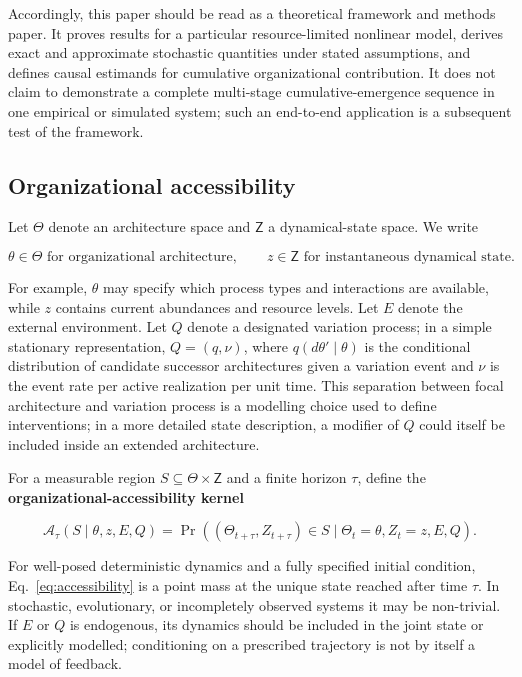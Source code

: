 \documentclass[11pt,a4paper]{article}
\begin{document}
Accordingly, this paper should be read as a theoretical framework and methods paper. It proves results for a particular resource-limited nonlinear model, derives exact and approximate stochastic quantities under stated assumptions, and defines causal estimands for cumulative organizational contribution. It does not claim to demonstrate a complete multi-stage cumulative-emergence sequence in one empirical or simulated system; such an end-to-end application is a subsequent test of the framework.

\subsection{Organizational accessibility}

Let $\mathsf\Theta$ denote an architecture space and $\mathsf Z$ a dynamical-state space. We write

\[
\theta\in\mathsf\Theta \text{ for organizational architecture},
\qquad
z\in\mathsf Z \text{ for instantaneous dynamical state}.
\]

For example, $\theta$ may specify which process types and interactions are available, while $z$ contains current abundances and resource levels. Let $E$ denote the external environment. Let $Q$ denote a designated variation process; in a simple stationary representation, $Q=(q,\nu)$, where $q(d\theta'\mid\theta)$ is the conditional distribution of candidate successor architectures given a variation event and $\nu$ is the event rate per active realization per unit time. This separation between focal architecture and variation process is a modelling choice used to define interventions; in a more detailed state description, a modifier of $Q$ could itself be included inside an extended architecture.

For a measurable region $S\subseteq\mathsf\Theta\times\mathsf Z$ and a finite horizon $\tau$, define the \textbf{organizational-accessibility kernel}

\begin{equation}
\boxed{
\mathcal A_\tau(S\mid\theta,z,E,Q)
=
\Pr\!\left(
(\Theta_{t+\tau},Z_{t+\tau})\in S
\mid
\Theta_t=\theta,Z_t=z,E,Q
\right).
}
\label{eq:accessibility}
\end{equation}

For well-posed deterministic dynamics and a fully specified initial condition, Eq.~\eqref{eq:accessibility} is a point mass at the unique state reached after time $\tau$. In stochastic, evolutionary, or incompletely observed systems it may be non-trivial. If $E$ or $Q$ is endogenous, its dynamics should be included in the joint state or explicitly modelled; conditioning on a prescribed trajectory is not by itself a model of feedback.
\end{document}
